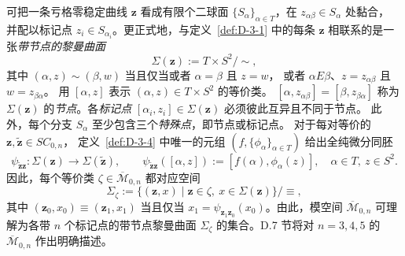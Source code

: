 可把一条亏格零稳定曲线 $\mathbf z$ 看成有限个二球面
$\{S_\alpha\}_{\alpha\in T}$，在 $z_{\alpha\beta}\in S_\alpha$ 处黏合，
并配以标记点 $z_i\in S_{\alpha_i}$。更正式地，与定义~\ref{def:D-3-1}
中的每条 $\mathbf z$ 相联系的是一张\emph{带节点的黎曼曲面}
\begin{equation}\label{eq:D-3-2}
  \Sigma(\mathbf z):=T\times S^2/\sim,
\end{equation}
其中 $(\alpha,z)\sim(\beta,w)$ 当且仅当或者 $\alpha=\beta$ 且 $z=w$，
或者 $\alpha E\beta$、$z=z_{\alpha\beta}$ 且 $w=z_{\beta\alpha}$。
用 $[\alpha,z]$ 表示 $(\alpha,z)\in T\times S^2$ 的等价类。
$[\alpha,z_{\alpha\beta}]=[\beta,z_{\beta\alpha}]$ 称为
$\Sigma(\mathbf z)$ 的\emph{节点}。各\emph{标记点}
$[\alpha_i,z_i]\in\Sigma(\mathbf z)$ 必须彼此互异且不同于节点。
此外，每个分支 $S_\alpha$ 至少包含三个\emph{特殊点}，即节点或标记点。
对于每对等价的 $\mathbf z,\widetilde{\mathbf z}\in SC_{0,n}$，
定义~\ref{def:D-3-4} 中唯一的元组 $(f,\{\phi_\alpha\}_{\alpha\in T})$
给出全纯微分同胚
\[
  \psi_{\widetilde{\mathbf z}\mathbf z}:\Sigma(\mathbf z)
  \longrightarrow\Sigma(\widetilde{\mathbf z}),\qquad
  \psi_{\widetilde{\mathbf z}\mathbf z}([\alpha,z])
  :=[f(\alpha),\phi_\alpha(z)],\quad\alpha\in T,\ z\in S^2.
\]
因此，每个等价类 $\zeta\in\overline{\mathcal M}_{0,n}$ 都对应空间
\begin{equation}\label{eq:D-3-3}
  \Sigma_\zeta:=\{(\mathbf z,x)\mid\mathbf z\in\zeta,\
  x\in\Sigma(\mathbf z)\}/\equiv,
\end{equation}
其中 $(\mathbf z_0,x_0)\equiv(\mathbf z_1,x_1)$ 当且仅当
$x_1=\psi_{\mathbf z_1\mathbf z_0}(x_0)$。由此，模空间
$\overline{\mathcal M}_{0,n}$ 可理解为各带 $n$ 个\BookRecordIndex{T0066}标记点的带节点黎曼曲面
$\Sigma_\zeta$ 的集合。D.7 节将对 $n=3,4,5$ 的
$\overline{\mathcal M}_{0,n}$ 作出明确描述。
